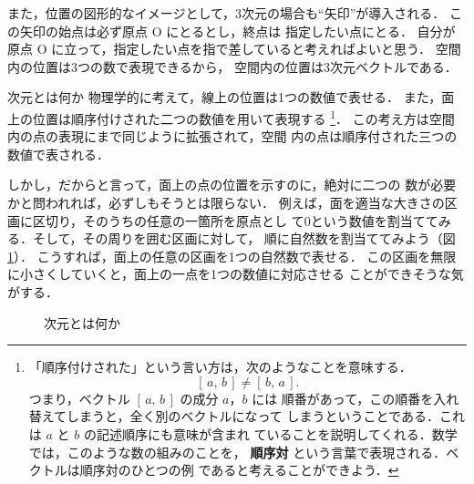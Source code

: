             また，位置の図形的なイメージとして，3次元の場合も“矢印”が導入される．
            この矢印の始点は必ず原点 O にとるとし，終点は
            指定したい点にとる．
            自分が原点 O に立って，指定したい点を指で差していると考えればよいと思う．
            空間内の位置は3つの数で表現できるから，
            空間内の位置は3次元ベクトルである．

            \begin{memo}{次元とは何か}
                物理学的に考えて，線上の位置は1つの数値で表せる．
                また，面上の位置は順序付けされた二つの数値を用いて表現する
                \footnote{
                    「順序付けされた」という言い方は，次のようなことを意味する．
                        \begin{equation*}
                            \left[\, a ,\, b \, \right] \neq \left[\, b, \,a \, \right].
                        \end{equation*}
                    つまり，ベクトル $\left[\, a ,\, b \, \right]$ の成分 $a$，$b$ には
                    順番があって，この順番を入れ替えてしまうと，全く別のベクトルになって
                    しまうということである．これは $a$ と $b$ の記述順序にも意味が含まれ
                    ていることを説明してくれる．数学では，このような数の組みのことを，
                    \textbf{順序対} という言葉で表現される．ベクトルは順序対のひとつの例
                    であると考えることができよう．
                }．
                この考え方は空間内の点の表現にまで同じように拡張されて，空間
                内の点は順序付された三つの数値で表される．

                しかし，だからと言って，面上の点の位置を示すのに，絶対に二つの
                数が必要かと問われれば，必ずしもそうとは限らない．
                例えば，面を適当な大きさの区画に区切り，そのうちの任意の一箇所を原点とし
                て0という数値を割当ててみる．そして，その周りを囲む区画に対して，
                順に自然数を割当ててみよう（図\ref{fig:JigenTohaNanika_MATH}）．
                こうすれば，面上の任意の区画を1つの自然数で表せる．
                この区画を無限に小さくしていくと，面上の一点を1つの数値に対応させる
                ことができそうな気がする．
                \begin{figure}[hbt]
                    \begin{center}
                        \caption{次元とは何か}
                        \label{fig:JigenTohaNanika_MATH}
                    \end{center}
                \end{figure}


\end{memo}
